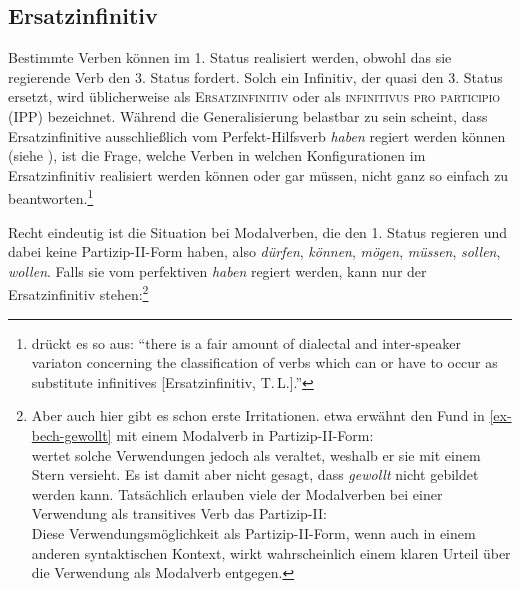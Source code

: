 \subsection{Ersatzinfinitiv}

Bestimmte Verben können im 1. Status realisiert werden, obwohl das sie regierende Verb den 3. Status fordert. Solch ein Infinitiv, der quasi den 3. Status ersetzt, wird üblicherweise als \textsc{Ersatzinfinitiv} oder als \textsc{infinitivus pro participio (IPP)} bezeichnet. Während die Generalisierung belastbar zu sein scheint, dass Ersatzinfinitive ausschlie\ss lich vom Perfekt-Hilfsverb {\it haben} regiert werden können (siehe \citealt[62ff]{Meurers:99}), ist die Frage, welche Verben in welchen Konfigurationen im Ersatzinfinitiv realisiert werden können oder gar müssen, nicht ganz so einfach zu beantworten.\footnote{\citet[53]{Meurers:99} drückt es so aus: "`there is a fair amount of dialectal and inter-speaker variaton concerning the classification of verbs which can or have to occur as substitute infinitives [Ersatzinfinitiv, T.\,L.]."' }

Recht eindeutig ist die Situation bei Modalverben, die den 1. Status regieren und dabei keine Partizip-II-Form haben, also \textit{dürfen}, \textit{können}, \textit{mögen}, \textit{müssen}, \textit{sollen}, \textit{wollen}. Falls sie vom perfektiven {\it haben} regiert werden, kann nur der Ersatzinfinitiv stehen:\footnote{Aber auch hier gibt es schon erste Irritationen. \cite{Bech:55} etwa erwähnt den Fund in \ref{ex-bech-gewollt} mit einem Modalverb in Partizip-II-Form:\\
\citet[53]{Meurers:99} wertet solche Verwendungen jedoch als veraltet, weshalb er sie mit einem Stern versieht. Es ist damit aber nicht gesagt, dass {\it gewollt} nicht gebildet werden kann. Tatsächlich erlauben viele der Modalverben bei einer Verwendung als transitives Verb das Partizip-II:\\
Diese Verwendungsmöglichkeit als Partizip-II-Form, wenn auch in einem anderen syntaktischen Kontext, wirkt wahrscheinlich einem klaren Urteil über die Verwendung als Modalverb entgegen.}
  

